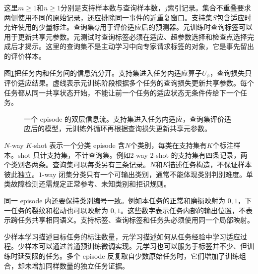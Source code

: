 这里$m\geq1$和$n\geq1$分别是支持样本数与查询样本数，$j$索引记录。集合不重叠要求两侧使用不同的原始记录，还应排除同一事件的近重复窗口。支持集$S$包含适应时允许使用的少量标注。查询集$Q$用于评价适应后的预测器。元训练时查询标签可以用于更新共享元参数。元测试时查询标签必须在适应、超参数选择和检查点选择完成后才揭示。这里的查询集不是主动学习中向专家请求标签的对象，它是事先留出的评价样本。

图\ref{fig:meta-support-query}把任务内和任务间的信息流分开。支持集进入任务内适应算子$U_\phi$，查询损失只评价适应结果。虚线表示元训练阶段根据多个任务的查询损失更新共享参数。每个任务都从同一共享状态开始，不能让前一个任务的适应状态无条件传给下一个任务。

\begin{figure}[htbp]
\centering
{}
\caption{一个 episode 的双层信息流。支持集进入任务内适应，查询集评价适应后的模型，元训练外循环再根据查询损失更新共享元参数。}
\label{fig:meta-support-query}
\end{figure}

$N$-way $K$-shot 表示一个分类 episode 含$N$个类别，每类在支持集有$K$个标注样本。shot 只计支持集，不计查询集。例如$2$-way $2$-shot 的支持集有四条记录，两个类别各两条。查询集可以每类另有三条记录。$N$和$K$描述任务构造，不保证样本彼此独立。$1$-way 闭集分类只有一个可输出类别，通常不能体现类别判别难度。单类故障检测还需规定正常参考、未知类别和拒识规则。

同一 episode 内还要保持类别编号一致。例如本任务的正常和磨损映射为 $0,1$，下一任务的裂纹和松动也可以映射为 $0,1$。这些数字表示任务内部的输出位置，不表示跨任务共享相同语义。支持标签、查询标签和任务头必须使用同一个局部映射。

少样本学习描述目标任务的标注数量，元学习描述如何从任务经验中学习适应过程。少样本可以通过普通预训练微调实现。元学习也可以服务于标签并不少、但训练时延受限的任务。多个 episode 反复取自少数原始任务时，它们增加了训练组合，却未增加同样数量的独立任务证据。

